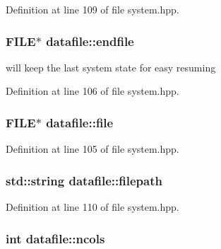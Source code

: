 Definition at line 109 of file system.\-hpp.

\hypertarget{classdatafile_a45a1c9f31429aa1d8b54a02722095a1a}{
\subsubsection[{endfile}]{\setlength{\rightskip}{0pt plus 5cm}F\-I\-L\-E$\ast$ datafile\-::endfile\hspace{0.3cm}{\ttfamily [private]}}}\label{classdatafile_a45a1c9f31429aa1d8b54a02722095a1a}


will keep the last system state for easy resuming 



Definition at line 106 of file system.\-hpp.

\hypertarget{classdatafile_ae70cc0653ae8f036afaf64f30d9c88e7}{
\subsubsection[{file}]{\setlength{\rightskip}{0pt plus 5cm}F\-I\-L\-E$\ast$ datafile\-::file\hspace{0.3cm}{\ttfamily [private]}}}\label{classdatafile_ae70cc0653ae8f036afaf64f30d9c88e7}


Definition at line 105 of file system.\-hpp.

\hypertarget{classdatafile_af336f792f53618ff6d5f0dbe3d05e755}{
\subsubsection[{filepath}]{\setlength{\rightskip}{0pt plus 5cm}std\-::string datafile\-::filepath\hspace{0.3cm}{\ttfamily [private]}}}\label{classdatafile_af336f792f53618ff6d5f0dbe3d05e755}


Definition at line 110 of file system.\-hpp.

\hypertarget{classdatafile_a530295db9ac71c1417f1451ee3dcbf35}{
\subsubsection[{ncols}]{\setlength{\rightskip}{0pt plus 5cm}int datafile\-::ncols\hspace{0.3cm}{\ttfamily [private]}}}\label{classdatafile_a530295db9ac71c1417f1451ee3dcbf35}


